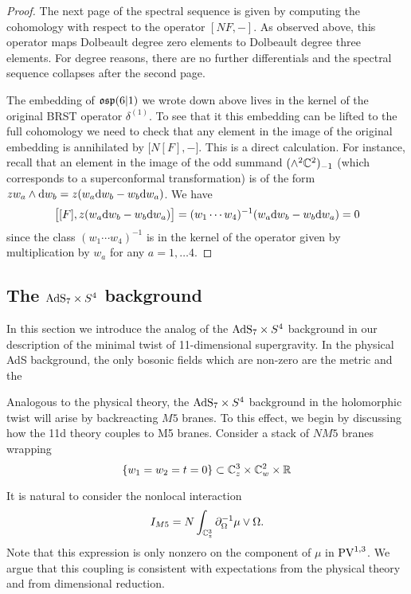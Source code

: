 \begin{proof}
The next page of the spectral sequence is given by computing the cohomology with respect to the operator $[N F,-]$. 
As observed above, this operator maps Dolbeault degree zero elements to Dolbeault degree three elements. 
For degree reasons, there are no further differentials and the spectral sequence collapses after the second page. 

The embedding of $\mathfrak{osp}(6|1)$ we wrote down above lives in the kernel of the original BRST operator $\delta^{(1)}$. 
To see that it this embedding can be lifted to the full cohomology we need to check that any element in the image of the original embedding is annihilated by $\big[ N [F] , - \big]$. 
This is a direct calculation. 
For instance, recall that an element in the image of the odd summand $(\wedge^2 \mathbb C^2)_{-1}$ (which corresponds to a superconformal transformation) is of the form $z w_a \wedge {\rm d} w_b = z(w_a {\rm d} w_b - w_b {\rm d} w_a)$. 
We have
\[
\big[[F] , z(w_a {\rm d} w_b - w_b {\rm d} w_a) \big] = (w_1\cdots w_4)^{-1} (w_a {\rm d} w_b - w_b {\rm d} w_a) = 0
\]
since the class $(w_1\cdots w_4)^{-1}$ is in the kernel of the operator given by multiplication by $w_a$ for any $a = 1,\ldots 4$. 
\end{proof}

\subsection{The ${\rm AdS}_7 \times S^4$ background}

In this section we introduce the analog of the ${\rm AdS}_7 \times S^4$ background in our description of the minimal twist of 11-dimensional supergravity. 
In the physical AdS background, the only bosonic fields which are non-zero are the metric and the 


Analogous to the physical theory, the ${\rm AdS}_7 \times S^4$ background in the holomorphic twist will arise by backreacting $M5$ branes. To this effect, we begin by discussing how the 11d theory couples to M5 branes. 
Consider a stack of $N M5$ branes wrapping 
\[
\{w_1=w_2=t=0\} \subset \mathbb{C}^3_z\times \mathbb{C}^2_w\times \mathbb{R} 
\] 

It is natural to consider the nonlocal interaction 
\[
I_{M5} = N\int_{\mathbb{C}^3_z} \partial_{\Omega}^{-1}\mu \vee \Omega.
\]
Note that this expression is only nonzero on the component of $\mu$ in ${\rm PV}^{1,3}$. 
We argue that this coupling is consistent with expectations from the physical theory and from dimensional reduction. 

